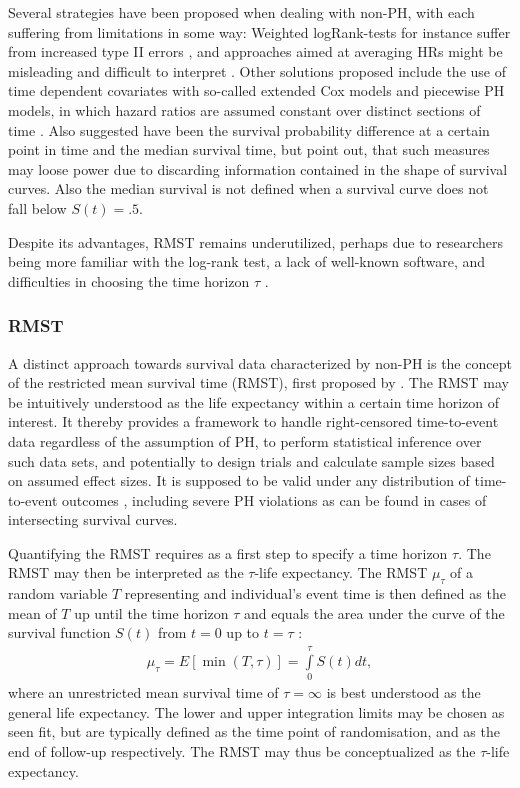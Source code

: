 \documentclass[main.tex]{subfiles}
\begin{document}
Several strategies have been proposed when dealing with non-PH, with each suffering from limitations in some way: Weighted logRank-tests for instance suffer from increased type II errors \parencite{kalbfleisch1981estimation}, and approaches aimed at averaging HRs might be misleading and difficult to interpret \parencite{Brand2013-pf}. Other solutions proposed include the use of time dependent covariates with so-called extended Cox models \parencite{therneau2017using} and piecewise PH models, in which hazard ratios are assumed constant over distinct sections of time \parencite{kleinbaum2012survival}. Also suggested have been the survival probability difference at a certain point in time and the median survival time, but \textcite{Eaton2020-xo} point out, that such measures may loose power due to discarding information contained in the shape of survival curves. Also the median survival is not defined when a survival curve does not fall below $S(t) = .5$.

Despite its advantages, RMST remains underutilized, perhaps due to researchers being more familiar with the log-rank test, a lack of well-known software, and difficulties in choosing the time horizon $\tau$ \parencite{Eaton2020-xo}.
 \subsubsection{RMST}
A distinct approach towards survival data characterized by non-PH is the concept of the restricted mean survival time (RMST), first proposed by \textcite{irwin1949standard}. The RMST may be intuitively understood as the life expectancy within a certain time horizon of interest. It thereby provides a framework to handle right-censored time-to-event data regardless of the assumption of PH, to perform statistical inference over such data sets, and potentially to design trials and calculate sample sizes based on assumed effect sizes. It is supposed to be valid under any distribution of time-to-event outcomes \parencite{royston2013restricted}, including severe PH violations as can be found in cases of intersecting survival curves.

Quantifying the RMST requires as a first step to specify a time horizon $\tau$. The RMST may then be interpreted as the $\tau$-life expectancy. The RMST $\mu_{\tau}$ of a random variable $T$ representing and individual's event time is then defined as the mean of $T$ up until the time horizon $\tau$ and equals the area under the curve of the survival function $S(t)$ from $t=0$ up to $t=\tau$ \parencite{andersen2010}:
\begin{align}\label{RMST}
\mu_{\tau} = E[\min(T, \tau)] = \int\limits_0^{\tau}S(t)dt,
\end{align}
where an unrestricted mean survival time of $\tau = \infty$ is best understood as the general life expectancy. The lower and upper integration limits may be chosen as seen fit, but are typically defined as the time point of randomisation, and as the end of follow-up respectively. The RMST may thus be conceptualized as the $\tau$-life expectancy.
\end{document}

